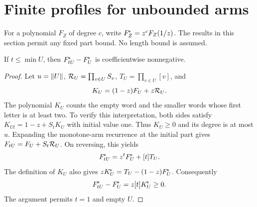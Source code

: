 \section{Finite profiles for unbounded arms}\label{sec:profiles}
For a polynomial $F_Z$ of degree $c$, write $F_Z^{\!*}=z^cF_Z(1/z)$. The results in this section permit any fixed part bound. No length bound is assumed.

\begin{lemma}\label{lem:prefixreverse}
If $t\le\min U$, then $F_{tU}^{\!*}-F_U^{\!*}$ is coefficientwise nonnegative.
\end{lemma}
\begin{proof}
Let $u=\lVert U\rVert$, $\mathcal R_U=\prod_{v\in U}S_v$, $T_U=\prod_{v\in U}[v]$, and
\[
 K_U=(1-z)F_U+z\mathcal R_U.
\]
The polynomial $K_U$ counts the empty word and the smaller words whose first letter is at least two. To verify this interpretation, both sides satisfy $K_{Ut}=1-z+S_tK_U$ with initial value one. Thus $K_U\ge0$ and its degree is at most $u$. Expanding the monotone-arm recurrence at the initial part gives $F_{tU}=F_U+S_t\mathcal R_U$. On reversing, this yields
\[
 F_{tU}^{\!*}=z^tF_U^{\!*}+[t]T_U.
\]
The definition of $K_U$ also gives $zK_U^{\!*}=T_U-(1-z)F_U^{\!*}$. Consequently
\begin{equation}\label{eq:prefixpositive}
 F_{tU}^{\!*}-F_U^{\!*}=z[t]K_U^{\!*}\ge0.
\end{equation}
The argument permits $t=1$ and empty $U$.
\end{proof}

